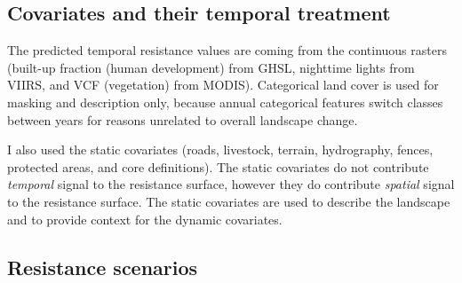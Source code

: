 \subsection{Covariates and their temporal treatment}
\label{sec:covariates}

The predicted temporal resistance values are coming from the continuous rasters (built-up fraction (human development) from GHSL, nighttime lights from VIIRS, and VCF (vegetation) from MODIS). Categorical land cover is used for masking and description only, because annual categorical features switch classes between years for reasons unrelated to overall landscape change.

I also used the static covariates (roads, livestock, terrain, hydrography, fences, protected areas, and core definitions). The static covariates do not contribute \textit{temporal} signal to the resistance surface, however they do contribute \textit{spatial} signal to the resistance surface. The static covariates are used to describe the landscape and to provide context for the dynamic covariates.

\subsection{Resistance scenarios}
\label{sec:resistance}

